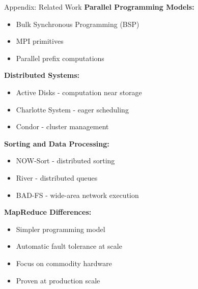 \documentclass[aspectratio=169]{beamer}
\begin{document}
\begin{frame}{Appendix: Related Work}
\textbf{Parallel Programming Models:}
\begin{itemize}
    \item Bulk Synchronous Programming (BSP)
    \item MPI primitives
    \item Parallel prefix computations
\end{itemize}

\vspace{0.2cm}

\textbf{Distributed Systems:}
\begin{itemize}
    \item Active Disks - computation near storage
    \item Charlotte System - eager scheduling
    \item Condor - cluster management
\end{itemize}

\vspace{0.2cm}

\textbf{Sorting and Data Processing:}
\begin{itemize}
    \item NOW-Sort - distributed sorting
    \item River - distributed queues
    \item BAD-FS - wide-area network execution
\end{itemize}

\vspace{0.2cm}

\textbf{MapReduce Differences:}
\begin{itemize}
    \item Simpler programming model
    \item Automatic fault tolerance at scale
    \item Focus on commodity hardware
    \item Proven at production scale
\end{itemize}
\end{frame}
\end{document}

